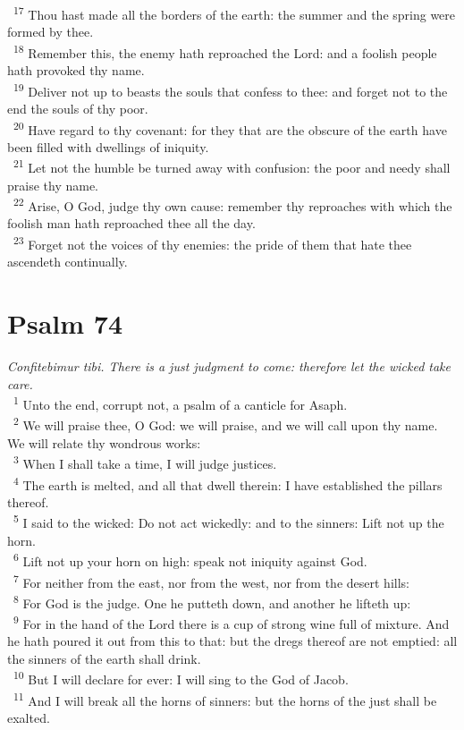 \documentclass[a5paper,12pt]{article}
\begin{document}
\begin{multicols*}{2}
~\textsuperscript{17} Thou hast made all the borders of the earth: the summer and the spring were formed by thee.\\
~\textsuperscript{18} Remember this, the enemy hath reproached the Lord: and a foolish people hath provoked thy name.\\
~\textsuperscript{19} Deliver not up to beasts the souls that confess to thee: and forget not to the end the souls of thy poor.\\
~\textsuperscript{20} Have regard to thy covenant: for they that are the obscure of the earth have been filled with dwellings of iniquity.\\
~\textsuperscript{21} Let not the humble be turned away with confusion: the poor and needy shall praise thy name.\\
~\textsuperscript{22} Arise, O God, judge thy own cause: remember thy reproaches with which the foolish man hath reproached thee all the day.\\
~\textsuperscript{23} Forget not the voices of thy enemies: the pride of them that hate thee ascendeth continually.\\

\section{Psalm 74}
\label{sec:orge6f5361}
\emph{Confitebimur tibi. There is a just judgment to come: therefore let the wicked take care.}\\

~\textsuperscript{1} Unto the end, corrupt not, a psalm of a canticle for Asaph.\\
~\textsuperscript{2} We will praise thee, O God: we will praise, and we will call upon thy name. We will relate thy wondrous works:\\
~\textsuperscript{3} When I shall take a time, I will judge justices.\\
~\textsuperscript{4} The earth is melted, and all that dwell therein: I have established the pillars thereof.\\
~\textsuperscript{5} I said to the wicked: Do not act wickedly: and to the sinners: Lift not up the horn.\\
~\textsuperscript{6} Lift not up your horn on high: speak not iniquity against God.\\
~\textsuperscript{7} For neither from the east, nor from the west, nor from the desert hills:\\
~\textsuperscript{8} For God is the judge. One he putteth down, and another he lifteth up:\\
~\textsuperscript{9} For in the hand of the Lord there is a cup of strong wine full of mixture. And he hath poured it out from this to that: but the dregs thereof are not emptied: all the sinners of the earth shall drink.\\
~\textsuperscript{10} But I will declare for ever: I will sing to the God of Jacob.\\
~\textsuperscript{11} And I will break all the horns of sinners: but the horns of the just shall be exalted.\\


\end{multicols*}
\end{document}
